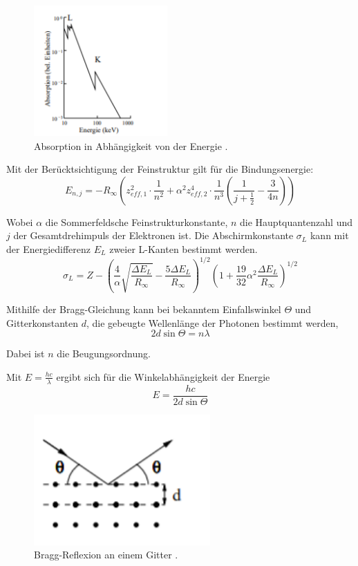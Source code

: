 \begin{figure}[H]
  \centering
  \includegraphics[height=5cm]{kante.PNG}
  \caption{Absorption in Abhängigkeit von der Energie \cite{sample}.}
  \label{fig:kathode}
\end{figure}

Mit der Berücktsichtigung der Feinstruktur gilt für die Bindungsenergie:
\begin{equation}
E_{n,j} = -R_{\infty} \left( z_{eff,1}^2 \cdot \frac{1}{n^2} + \alpha^2 z_{eff,2}^4 \cdot \frac{1}{n^3}
\left(\frac{1}{j+ \frac{1}{2}} - \frac{3}{4n} \right) \right)
\end{equation}

Wobei $\alpha$ die Sommerfeldsche Feinstrukturkonstante, $n$ die Hauptquantenzahl und $j$ der Gesamtdrehimpuls der
Elektronen ist.
Die Abschirmkonstante $\sigma_L$ kann mit der Energiedifferenz $E_L$ zweier L-Kanten bestimmt werden.
\begin{equation}
  \sigma_L = Z -\left(\frac{4}{\alpha} \sqrt{\frac{\Delta E_L}{R_{\infty}}} - \frac{5 \Delta E_L}{R_{\infty}} \right)^{1/2}
  \left(1 + \frac{19}{32} \alpha^2  \frac{\Delta E_L}{R_{\infty}} \right)^{1/2}
\end{equation}


Mithilfe der Bragg-Gleichung kann bei bekanntem Einfallswinkel $\Theta$ und Gitterkonstanten $d$, die gebeugte Wellenlänge
der Photonen bestimmt werden,
\begin{equation}
  2d \sin{\Theta} = n \lambda
\end{equation}

Dabei ist $n$ die Beugungsordnung.

Mit $E = \frac{hc}{\lambda}$ ergibt sich für die Winkelabhängigkeit der Energie
\begin{equation}
   E = \frac{hc}{2d \sin{\Theta}}
\end{equation}

\begin{figure}[H]
  \centering
  \includegraphics[height=5cm]{bragg.PNG}
  \caption{Bragg-Reflexion an einem Gitter \cite{sample}.}
  \label{fig:kathode}
\end{figure}
